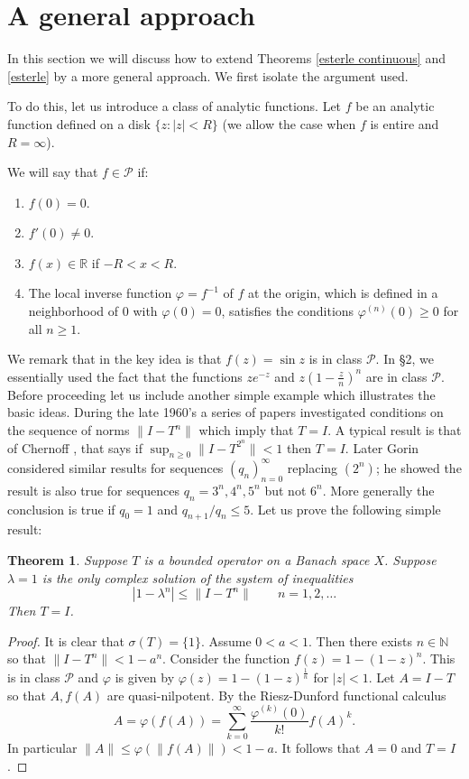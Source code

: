 \documentclass[12pt]{amsart}
\newtheorem{thm}{Theorem}[section]
\begin{document}
\section{A general approach}
\label{general}

In this section we will discuss how to extend Theorems
\ref{esterle continuous} and \ref{esterle} by a more general
approach. We first isolate the argument used.

To do this, let us introduce a class of analytic functions.  Let
$f$ be an analytic function defined on a disk $\{z:|z|<R\}$ (we
allow the case when $f$ is entire and $R=\infty$).


We will say
that $f\in \mathcal P$ if:\begin{enumerate}
\item $f(0)=0$.\item $f'(0)\neq 0$.\item $f(x)\in\mathbb R$ if
$-R<x<R$.
\item The local inverse function $\varphi=f^{-1}$ of $f$ at the origin,
which is defined in a
neighborhood of $0$ with $\varphi(0)=0$, satisfies the conditions
$\varphi^{(n)}(0)\ge 0$ for all $n\ge 1$.
\end{enumerate}

We remark that in \cite{bonsall-crabb} the key idea is that
$f(z)=\sin z$ is in class $\mathcal P$.  In \S2, we essentially
used the fact that the functions $ze^{-z}$ and $z(1-\frac{z}n)^n$
are in class $\mathcal P$. Before proceeding let us include
another simple example which illustrates the basic ideas. During
the late 1960's a series of papers investigated conditions on the
sequence of norms $\|I-T^n\|$ which imply that $T=I$.  A typical
result is that of Chernoff \cite{chernoff}, that says if
$\sup_{n\ge 0}\|I-T^{2^n}\|<1$ then $T=I$. 
Later Gorin \cite{gorin} considered
similar results for sequences $(q_n)_{n=0}^{\infty}$ replacing
$(2^n)$; he showed the result is also true for sequences
 $q_n=3^n,4^n,5^n$ but not $6^n$. More generally the conclusion 
is true if $q_0=1$ and $q_{n+1}/q_n\le 5$.
Let us prove the following
simple result:

\begin{thm}\label{chernoffgorin} Suppose $T$ is a bounded operator on a
Banach space
$X$.  Suppose $\lambda=1$ is the only complex
solution of the
system of inequalities
$$ |1-\lambda^n|\le \|I-T^n\| \qquad n=1,2,\ldots$$
Then $T=I$.\end{thm}

\begin{proof} It is clear that $\sigma(T)=\{1\}$.
Assume $0<a<1$.  Then there exists $n\in\mathbb N$ so that
$\|I-T^n\|<1-a^n$. Consider the function $f(z)=1-(1-z)^n$.  This
is in class $\mathcal P$ and $\varphi$ is given by $\varphi(z)=
1-(1-z)^{\frac1n}$ for $|z|<1$. Let $A=I-T$ so that $A,f(A)$ are
quasi-nilpotent.  By the Riesz-Dunford functional calculus $$
A=\varphi(f(A))=\sum_{k=0}^{\infty}\frac{\varphi^{(k)}(0)}{k!}f(A)^k.$$
In particular $\|A\| \le \varphi(\|f(A)\|)<1-a$.  It follows that
$A=0$ and $T=I$.\end{proof}
\end{document}
